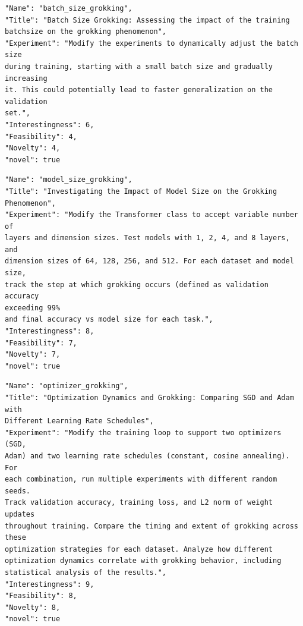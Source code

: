 \begin{tcolorbox}[breakable,colback=blue!5!white, colframe=blue!75!black, title=Seed Idea - \texttt{batch\_size\_grokking}]
\small
\begin{verbatim}
"Name": "batch_size_grokking",
"Title": "Batch Size Grokking: Assessing the impact of the training
batchsize on the grokking phenomenon",
"Experiment": "Modify the experiments to dynamically adjust the batch size
during training, starting with a small batch size and gradually increasing
it. This could potentially lead to faster generalization on the validation
set.",
"Interestingness": 6,
"Feasibility": 4,
"Novelty": 4,
"novel": true
\end{verbatim}
\end{tcolorbox}

\begin{tcolorbox}[breakable,colback=blue!5!white, colframe=blue!75!black, title=Idea 1/50 - \texttt{model\_size\_grokking}]
\small
\begin{verbatim}
"Name": "model_size_grokking",
"Title": "Investigating the Impact of Model Size on the Grokking
Phenomenon",
"Experiment": "Modify the Transformer class to accept variable number of
layers and dimension sizes. Test models with 1, 2, 4, and 8 layers, and
dimension sizes of 64, 128, 256, and 512. For each dataset and model size,
track the step at which grokking occurs (defined as validation accuracy
exceeding 99%
and final accuracy vs model size for each task.",
"Interestingness": 8,
"Feasibility": 7,
"Novelty": 7,
"novel": true
\end{verbatim}
\end{tcolorbox}

\begin{tcolorbox}[breakable,colback=blue!5!white, colframe=blue!75!black, title=Idea 2/50 - \texttt{optimizer\_grokking}]
\small
\begin{verbatim}
"Name": "optimizer_grokking",
"Title": "Optimization Dynamics and Grokking: Comparing SGD and Adam with
Different Learning Rate Schedules",
"Experiment": "Modify the training loop to support two optimizers (SGD,
Adam) and two learning rate schedules (constant, cosine annealing). For
each combination, run multiple experiments with different random seeds.
Track validation accuracy, training loss, and L2 norm of weight updates
throughout training. Compare the timing and extent of grokking across these
optimization strategies for each dataset. Analyze how different
optimization dynamics correlate with grokking behavior, including
statistical analysis of the results.",
"Interestingness": 9,
"Feasibility": 8,
"Novelty": 8,
"novel": true
\end{verbatim}
\end{tcolorbox}

